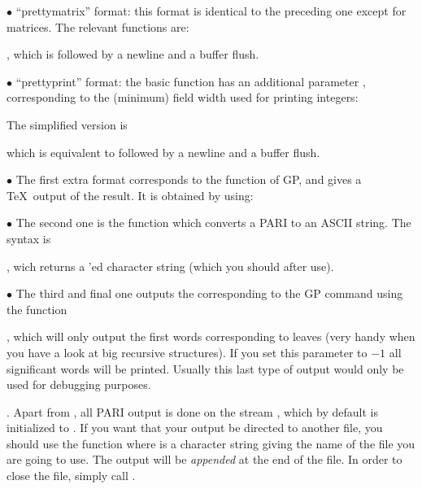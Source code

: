 \noindent $\bullet$ ``prettymatrix'' format: this format is identical to the
preceding one except for matrices. The relevant functions are:


, which is followed by a newline and a buffer flush.

\noindent $\bullet$ ``prettyprint'' format: the basic function has an
additional parameter , corresponding to the (minimum) field width
used for printing integers:


\noindent The simplified version is

 which is equivalent to
 followed by a newline and a buffer flush.

\noindent $\bullet$ The first extra format corresponds to the 
function of GP, and gives a \TeX\ output of the result. It is obtained by
using:


\noindent $\bullet$ The second one is the function  which
converts a PARI  to an ASCII string. The syntax is

, wich returns a 'ed character
string (which you should  after use).

\noindent $\bullet$ The third and final one outputs the 
corresponding to the GP command  using the function

, which will only output the first
 words corresponding to leaves (very handy when you have a look at
big recursive structures). If you set this parameter to $-1$ all
significant words will be printed. Usually this last type of output would
only be used for debugging purposes.

. Apart from , all PARI output is done on
the stream , which by default is initialized to . If
you want that your output be directed to another file, you should use the
function  where  is a
character string giving the name of the file you are going to use. The
output will be \emph{appended} at the end of the file. In order to close
the file, simply call .

